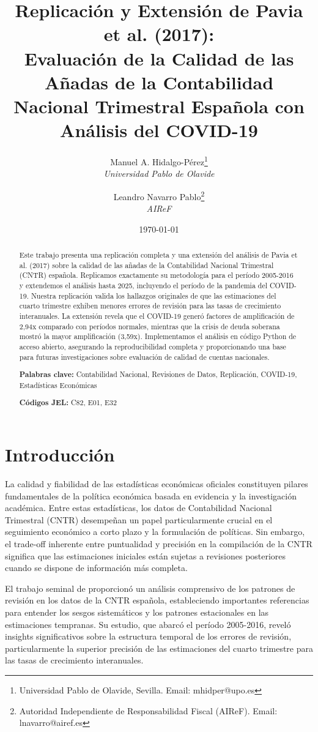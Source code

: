 \documentclass[12pt,a4paper]{article}
\title{\textbf{Replicación y Extensión de Pavia et al. (2017): \\Evaluación de la Calidad de las Añadas de la Contabilidad Nacional Trimestral Española con Análisis del COVID-19}}
\author{
    Manuel A. Hidalgo-Pérez\thanks{Universidad Pablo de Olavide, Sevilla. Email: mhidper@upo.es} \\ 
    \textit{Universidad Pablo de Olavide} \\[0.5em]
    \and
    Leandro Navarro Pablo\thanks{Autoridad Independiente de Responsabilidad Fiscal (AIReF). Email: lnavarro@airef.es} \\
    \textit{AIReF}
}
\date{\today}
\begin{document}
\maketitle

\begin{abstract}
\noindent Este trabajo presenta una replicación completa y una extensión del análisis de Pavia et al. (2017) sobre la calidad de las añadas de la Contabilidad Nacional Trimestral (CNTR) española. Replicamos exactamente su metodología para el período 2005-2016 y extendemos el análisis hasta 2025, incluyendo el período de la pandemia del COVID-19. Nuestra replicación valida los hallazgos originales de que las estimaciones del cuarto trimestre exhiben menores errores de revisión para las tasas de crecimiento interanuales. La extensión revela que el COVID-19 generó factores de amplificación de 2,94x comparado con períodos normales, mientras que la crisis de deuda soberana mostró la mayor amplificación (3,59x). Implementamos el análisis en código Python de acceso abierto, asegurando la reproducibilidad completa y proporcionando una base para futuras investigaciones sobre evaluación de calidad de cuentas nacionales.

\noindent \textbf{Palabras clave:} Contabilidad Nacional, Revisiones de Datos, Replicación, COVID-19, Estadísticas Económicas

\noindent \textbf{Códigos JEL:} C82, E01, E32
\end{abstract}

\newpage

\section{Introducción}

La calidad y fiabilidad de las estadísticas económicas oficiales constituyen pilares fundamentales de la política económica basada en evidencia y la investigación académica. Entre estas estadísticas, los datos de Contabilidad Nacional Trimestral (CNTR) desempeñan un papel particularmente crucial en el seguimiento económico a corto plazo y la formulación de políticas. Sin embargo, el trade-off inherente entre puntualidad y precisión en la compilación de la CNTR significa que las estimaciones iniciales están sujetas a revisiones posteriores cuando se dispone de información más completa.

El trabajo seminal de \citet{pavia2017} proporcionó un análisis comprensivo de los patrones de revisión en los datos de la CNTR española, estableciendo importantes referencias para entender los sesgos sistemáticos y los patrones estacionales en las estimaciones tempranas. Su estudio, que abarcó el período 2005-2016, reveló insights significativos sobre la estructura temporal de los errores de revisión, particularmente la superior precisión de las estimaciones del cuarto trimestre para las tasas de crecimiento interanuales.
\end{document}
